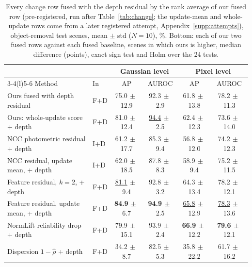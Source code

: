 \documentclass[journal]{IEEEtran}
\begin{document}
\begin{table}[t]
\centering
\caption{Every change row fused with the depth residual by the rank average of our fused row (pre-registered, run after Table~\ref{tab:change}; the update-mean and whole-update rows come from a later registered attempt, Appendix~\ref{supp:attempts}), object-removal test scenes, mean $\pm$ std ($N=10$), \%. Bottom: each of our two fused rows against each fused baseline, scenes in which ours is higher, median difference (points), exact sign test and Holm over the 24 tests.}
\label{tab:fused}
\footnotesize
\setlength{\tabcolsep}{5pt}
\begin{tabular}{@{}llcccc@{}}
\toprule
& & \multicolumn{2}{c}{Gaussian level} & \multicolumn{2}{c}{Pixel level}\\
\cmidrule(lr){3-4}\cmidrule(l){5-6}
Method & In & AP & AUROC & AP & AUROC\\
\midrule
Ours fused with depth residual & F+D & 75.0{\scriptsize$\,\pm\,$12.9} & 92.3{\scriptsize$\,\pm\,$2.9} & 61.8{\scriptsize$\,\pm\,$13.8} & 78.2{\scriptsize$\,\pm\,$11.3}\\
Ours: whole-update score + depth & F+D & 81.0{\scriptsize$\,\pm\,$12.4} & \underline{94.4}{\scriptsize$\,\pm\,$2.5} & 62.4{\scriptsize$\,\pm\,$12.3} & 73.6{\scriptsize$\,\pm\,$14.0}\\
NCC photometric residual + depth & I+D & 61.2{\scriptsize$\,\pm\,$17.7} & 85.3{\scriptsize$\,\pm\,$9.4} & 56.8{\scriptsize$\,\pm\,$12.0} & 74.2{\scriptsize$\,\pm\,$12.3}\\
NCC residual, update mean, + depth & I+D & 62.0{\scriptsize$\,\pm\,$18.5} & 87.8{\scriptsize$\,\pm\,$8.3} & 58.9{\scriptsize$\,\pm\,$9.4} & 75.2{\scriptsize$\,\pm\,$11.5}\\
Feature residual, $k=2$, + depth & F+D & \underline{81.1}{\scriptsize$\,\pm\,$9.4} & 92.8{\scriptsize$\,\pm\,$3.2} & 64.3{\scriptsize$\,\pm\,$13.4} & 78.2{\scriptsize$\,\pm\,$12.1}\\
Feature residual, update mean, + depth & F+D & \textbf{84.9}{\scriptsize$\,\pm\,$6.7} & \textbf{94.9}{\scriptsize$\,\pm\,$2.5} & \underline{65.8}{\scriptsize$\,\pm\,$12.9} & \underline{78.3}{\scriptsize$\,\pm\,$13.6}\\
NormLift reliability drop + depth & F+D & 79.9{\scriptsize$\,\pm\,$15.1} & 93.9{\scriptsize$\,\pm\,$2.4} & \textbf{66.9}{\scriptsize$\,\pm\,$12.2} & \textbf{79.6}{\scriptsize$\,\pm\,$12.1}\\
Dispersion $1-\hat\rho$ + depth & F+D & 34.2{\scriptsize$\,\pm\,$8.7} & 82.5{\scriptsize$\,\pm\,$5.3} & 35.8{\scriptsize$\,\pm\,$22.2} & 61.7{\scriptsize$\,\pm\,$16.2}\\
\bottomrule
\end{tabular}


\end{table}
\end{document}
